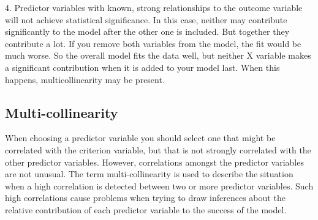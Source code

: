 \documentclass[a4paper,12pt]{article}
\begin{document}
4. Predictor variables with known, strong relationships to the outcome variable will not achieve statistical significance. In this case, neither may contribute significantly to the model after the other one is included. But together they contribute a lot. If you remove both variables from the model, the fit would be much worse. So the overall model fits the data well, but neither X variable makes a significant contribution when it is added to your model last. When this happens, multicollinearity may be present.

%
%
%
%
%
%


\subsection{Multi-collinearity}
When choosing a predictor variable you should select one that might be correlated with the criterion variable, but that is not strongly correlated with the other predictor variables. However, correlations amongst the predictor variables are not unusual. The term multi-collinearity  is used to describe the situation
when a high correlation is detected between two or more predictor variables.
Such high correlations cause problems when trying to draw inferences about the relative contribution of each predictor variable to the success of the model. 
\end{document}
